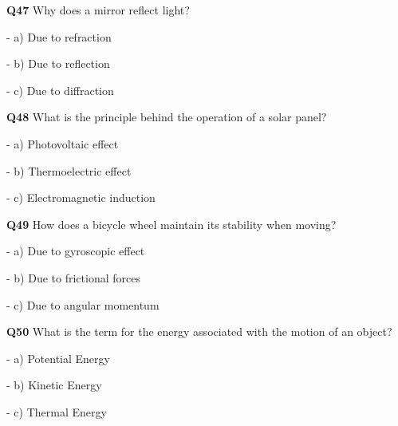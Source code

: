 \textbf{Q47} Why does a mirror reflect light?\par
\quad - a) Due to refraction\par
\quad - b) Due to reflection\par
\quad - c) Due to diffraction\par

\textbf{Q48} What is the principle behind the operation of a solar panel?\par
\quad - a) Photovoltaic effect\par
\quad - b) Thermoelectric effect\par
\quad - c) Electromagnetic induction\par

\textbf{Q49} How does a bicycle wheel maintain its stability when moving?\par
\quad - a) Due to gyroscopic effect\par
\quad - b) Due to frictional forces\par
\quad - c) Due to angular momentum\par

\textbf{Q50} What is the term for the energy associated with the motion of an object?\par
\quad - a) Potential Energy\par
\quad - b) Kinetic Energy\par
\quad - c) Thermal Energy\par